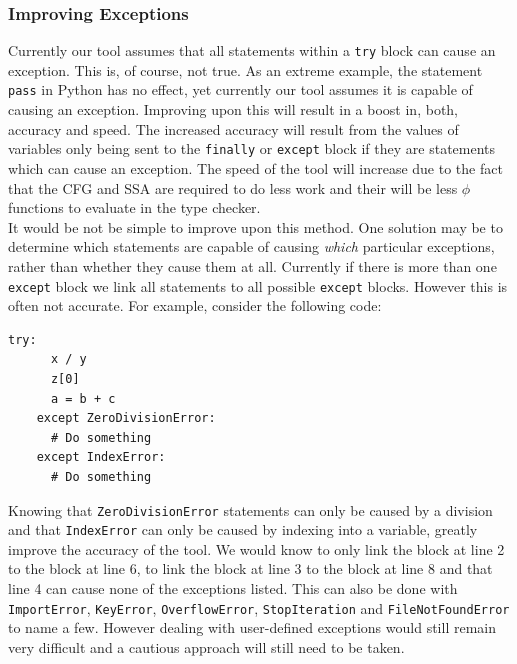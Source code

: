 \documentclass[12pt, titlepage]{article}
\begin{document}
\subsubsection*{Improving Exceptions}
Currently our tool assumes that all statements within a \texttt{try} block can cause an exception. This is, of course, not true. As an extreme example, the statement \texttt{pass} in Python has no effect, yet currently our tool assumes it is capable of causing an exception. Improving upon this will result in a boost in, both, accuracy and speed. The increased accuracy will result from the values of variables only being sent to the \texttt{finally} or \texttt{except} block if they are statements which can cause an exception. The speed of the tool will increase due to the fact that the CFG and SSA are required to do less work and their will be less $\phi$ functions to evaluate in the type checker. \\
\indent It would be not be simple to improve upon this method. One solution may be to determine which statements are capable of causing \textit{which} particular exceptions, rather than whether they cause them at all. Currently if there is more than one \texttt{except} block we link all statements to all possible \texttt{except} blocks. However this is often not accurate. For example, consider the following code:
\begin{lstlisting}[mathescape]
    try:
      x / y
      z[0]
      a = b + c
    except ZeroDivisionError:
      # Do something
    except IndexError:
      # Do something
\end{lstlisting}
Knowing that \texttt{ZeroDivisionError} statements can only be caused by a division and that \texttt{IndexError} can only be caused by indexing into a variable, greatly improve the accuracy of the tool. We would know to only link the block at line 2 to the block at line 6, to link the block at line 3 to the block at line 8 and that line 4 can cause none of the exceptions listed. This can also be done with \texttt{ImportError}, \texttt{KeyError}, \texttt{OverflowError}, \texttt{StopIteration} and \texttt{FileNotFoundError} to name a few. However dealing with user-defined exceptions would still remain very difficult and a cautious approach will still need to be taken.
\end{document}
